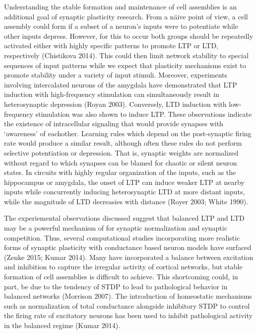 \documentclass{ucetd}
\begin{document}
Understanding the stable formation and maintenance of cell assemblies is an additional goal of synaptic plasticity research. From a n\"{a}ive point of view, a cell assembly could form if a subset of a neuron's inputs were to potentiate while other inputs depress. However, for this to occur both groups should be repeatedly activated either with highly specific patterns to promote LTP or LTD, respectively (Chistikova 2014). This could then limit network stability to special sequences of input patterns while we expect that plasticity mechanisms exist to promote stability under a variety of input stimuli. Moreover, experiments involving intercalated neurons of the amygdala have demonstrated that LTP induction with high-frequency stimulation can simultaneously result in heterosynaptic depression (Royan 2003). Conversely, LTD induction with low-frequency stimulation was also shown to induce LTP. These observations indicate the existence of intracellular signaling that would provide synapses with `awareness' of eachother. Learning rules which depend on the post-synaptic firing rate would produce a similar result, although often these rules do not perform selective potentiation or depression. That is, synaptic weights are normalized without regard to which synapses can be blamed for chaotic or silent neuron states. In circuits with highly regular organization of the inputs, such as the hippocampus or amygdala, the onset of LTP can induce weaker LTP at nearby inputs while concurrently inducing heterosynaptic LTD at more distant inputs, while the magnitude of LTD decreasies with distance (Royer 2003; White 1990).

The experiemental observations discussed suggest that balanced LTP and LTD may be a powerful mechanism of for synaptic normalization and synaptic competition. Thus, several computational studies incorporating more realistic forms of synaptic plasticity with conductance based neuron models have surfaced (Zenke 2015; Kumar 2014). Many have incorporated a balance between excitation and inhibition to capture the irregular activity of cortical networks, but stable formation of cell assemblies is difficult to achieve. This shortcoming could, in part, be due to the tendency of STDP to lead to pathological behavior in balanced networks (Morrison 2007). The introduction of homeostatic mechanisms such as normalization of total conductance alongside inhibitory STDP to control the firing rate of excitatory neurons has been used to inhibit pathological activity in the balanced regime (Kumar 2014). 
\end{document}
